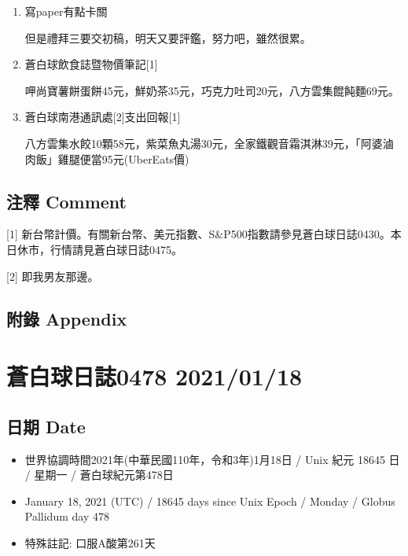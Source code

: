 \documentclass[
]{article}
\providecommand{\tightlist}{%
  \setlength{\itemsep}{0pt}\setlength{\parskip}{0pt}}
\begin{document}
\begin{enumerate}
\def\labelenumi{\arabic{enumi}.}
\item
  寫paper有點卡關

  但是禮拜三要交初稿，明天又要評鑑，努力吧，雖然很累。
\item
  蒼白球飲食誌暨物價筆記{[}1{]}

  呷尚寶薯餅蛋餅45元，鮮奶茶35元，巧克力吐司20元，八方雲集餛飩麵69元。
\item
  蒼白球南港通訊處{[}2{]}支出回報{[}1{]}

  八方雲集水餃10顆58元，紫菜魚丸湯30元，全家鐵觀音霜淇淋39元，「阿婆滷肉飯」雞腿便當95元(UberEats價)
\end{enumerate}

\hypertarget{ux6ce8ux91cb-comment-16}{%
\subsection{注釋 Comment}\label{ux6ce8ux91cb-comment-16}}

{[}1{]}
新台幣計價。有關新台幣、美元指數、S\&P500指數請參見蒼白球日誌0430。本日休市，行情請見蒼白球日誌0475。

{[}2{]} 即我男友那邊。

\hypertarget{ux9644ux9304-appendix-16}{%
\subsection{附錄 Appendix}\label{ux9644ux9304-appendix-16}}

\hypertarget{ux84bcux767dux7403ux65e5ux8a8c0478-20210118}{%
\section{蒼白球日誌0478
2021/01/18}\label{ux84bcux767dux7403ux65e5ux8a8c0478-20210118}}

\hypertarget{ux65e5ux671f-date-17}{%
\subsection{日期 Date}\label{ux65e5ux671f-date-17}}

\begin{itemize}
\tightlist
\item
  世界協調時間2021年(中華民國110年，令和3年)1月18日 / Unix 紀元 18645 日
  / 星期一 / 蒼白球紀元第478日
\item
  January 18, 2021 (UTC) / 18645 days since Unix Epoch / Monday / Globus
  Pallidum day 478
\item
  特殊註記: 口服A酸第261天
\end{itemize}
\end{document}
